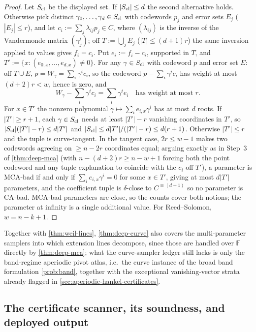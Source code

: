 \documentclass[11pt]{article}
\theoremstyle{definition}
\theoremstyle{remark}
\newcommand{\F}{\mathbb{F}}
\begin{document}
\begin{proof}
Let $S_{\rm cl}$ be the displayed set. If $|S_{\rm cl}|\le d$ the second alternative holds. Otherwise pick distinct $\gamma_0,\dots,\gamma_d\in S_{\rm cl}$ with codewords $p_j$ and error sets $E_j$ ($|E_j|\le r$), and let $c_i:=\sum_j\lambda_{ij}p_j\in C$, where $(\lambda_{ij})$ is the inverse of the Vandermonde matrix $(\gamma_j^i)$; off $T:=\bigcup_jE_j$ ($|T|\le(d+1)r$) the same inversion applied to values gives $f_i=c_i$. Put $e_i:=f_i-c_i$, supported in $T$, and $T':=\{x:(e_{0,x},\dots,e_{d,x})\ne0\}$. For any $\gamma\in S_{\rm cl}$ with codeword $p$ and error set $E$: off $T\cup E$, $p=W_\gamma=\sum_i\gamma^ic_i$, so the codeword $p-\sum_i\gamma^ic_i$ has weight at most $(d+2)r<w$, hence is zero, and
\[
W_\gamma-\sum_i\gamma^ic_i=\sum_i\gamma^ie_i
\quad\text{has weight at most }r .
\]
For $x\in T'$ the nonzero polynomial $\gamma\mapsto\sum_ie_{i,x}\gamma^i$ has at most $d$ roots. If $|T'|\ge r+1$, each $\gamma\in S_{\rm cl}$ needs at least $|T'|-r$ vanishing coordinates in $T'$, so $|S_{\rm cl}|(|T'|-r)\le d|T'|$ and $|S_{\rm cl}|\le d|T'|/(|T'|-r)\le d(r+1)$. Otherwise $|T'|\le r$ and the tuple is curve-tangent. In the tangent case, $2r\le w-1$ makes two codewords agreeing on $\ge n-2r$ coordinates equal; arguing exactly as in Step~3 of \cref{thm:deep-mca} \textup(with $n-(d+2)r\ge n-w+1$ forcing both the point codeword and any tuple explanation to coincide with the $c_i$ off $T'$\textup), a parameter is MCA-bad if and only if $\sum_ie_{i,x}\gamma^i=0$ for some $x\in T'$, giving at most $d|T'|$ parameters, and the coefficient tuple is $\delta$-close to $C^{\equiv(d+1)}$ so no parameter is CA-bad. MCA-bad parameters are close, so the counts cover both notions; the parameter at infinity is a single additional value. For Reed--Solomon, $w=n-k+1$.
\end{proof}

Together with \cref{thm:weil-lines}, \cref{thm:deep-curve} also covers the multi-parameter samplers into which extension lines decompose, since those are handled over $\F$ directly by \cref{thm:deep-mca}; what the curve-sampler ledger still lacks is only the band-regime aperiodic pivot atlas, i.e.\ the curve instance of the broad band formulation \cref{prob:band}, together with the exceptional vanishing-vector strata already flagged in \cref{sec:aperiodic-hankel-certificates}.

\subsection{The certificate scanner, its soundness, and deployed output}\label{sec:discharge-T6}
\end{document}
